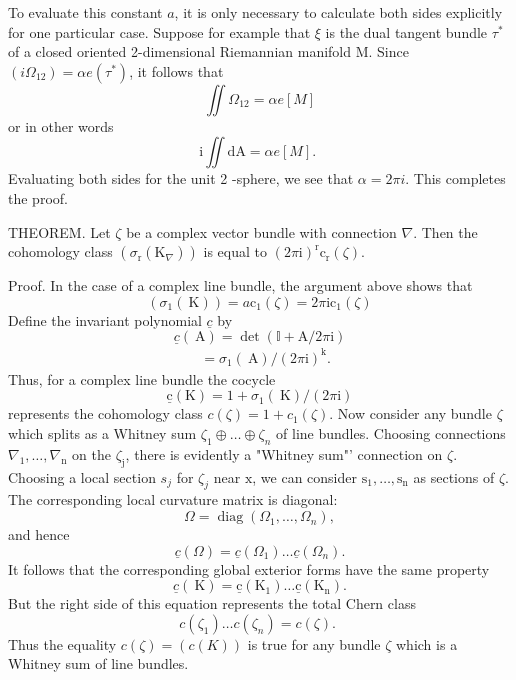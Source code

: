 \documentclass[10pt]{article}
\begin{document}
To evaluate this constant $a$, it is only necessary to calculate both sides explicitly for one particular case. Suppose for example that $\xi$ is the dual tangent bundle $\tau^{*}$ of a closed oriented 2-dimensional Riemannian manifold M. Since $\left(i \Omega_{12}\right)=\alpha e\left(\tau^{*}\right)$, it follows that
$$
\iint \Omega_{12}=\alpha e[M]
$$
or in other words
$$
\mathrm{i} \iint \mathrm{dA}=\alpha e[M] \text {. }
$$
Evaluating both sides for the unit 2 -sphere, we see that $\alpha=2 \pi i$. This completes the proof.

THEOREM. Let $\zeta$ be a complex vector bundle with connection $\nabla$. Then the cohomology class $\left(\sigma_{\mathrm{r}}\left(\mathrm{K}_{\nabla}\right)\right)$ is equal to $(2 \pi \mathrm{i})^{\mathrm{r}} \mathrm{c}_{\mathrm{r}}(\zeta)$.

Proof. In the case of a complex line bundle, the argument above shows that
$$
\left(\sigma_{1}(\mathrm{~K})\right)=a \mathrm{c}_{1}(\zeta)=2 \pi \mathrm{ic}_{1}(\zeta)
$$
Define the invariant polynomial $\underline{c}$ by
$$
\underline{c}(\mathrm{~A})=\operatorname{det}(\mathbb{I}+\mathrm{A} / 2 \pi \mathrm{i})
$$
$$
\begin{aligned}
& =\sigma_{1}(\mathrm{~A}) /(2 \pi \mathrm{i})^{\mathrm{k}} . 
\end{aligned}
$$
Thus, for a complex line bundle the cocycle
$$
\underline{\mathrm{c}}(\mathrm{K})=1+\sigma_{1}(\mathrm{~K}) /(2 \pi \mathrm{i})
$$
represents the cohomology class $c(\zeta)=1+c_{1}(\zeta)$. Now consider any bundle $\zeta$ which splits as a Whitney sum $\zeta_{1} \oplus \ldots \oplus \zeta_{n}$ of line bundles. Choosing connections $\nabla_{1}, \ldots, \nabla_{\mathrm{n}}$ on the $\zeta_{\mathrm{j}}$, there is evidently a "Whitney sum"' connection on $\zeta$. Choosing a local section $s_{j}$ for $\zeta_{j}$ near $\mathrm{x}$, we can consider $\mathrm{s}_{1}, \ldots, \mathrm{s}_{\mathrm{n}}$ as sections of $\zeta$. The corresponding local curvature matrix is diagonal:
$$
\Omega=\operatorname{diag}\left(\Omega_{1}, \ldots, \Omega_{n}\right),
$$
and hence
$$
\underline{c}(\Omega)=\underline{c}\left(\Omega_{1}\right) \ldots \underline{c}\left(\Omega_{n}\right) .
$$
It follows that the corresponding global exterior forms have the same property
$$
\underline{c}(\mathrm{~K})=\underline{\mathrm{c}}\left(\mathrm{K}_{1}\right) \ldots \underline{\mathrm{c}}\left(\mathrm{K}_{\mathrm{n}}\right) .
$$
But the right side of this equation represents the total Chern class
$$
c\left(\zeta_{1}\right) \ldots c\left(\zeta_{n}\right)=c(\zeta) \text {. }
$$
Thus the equality $c(\zeta)=(c(K))$ is true for any bundle $\zeta$ which is a Whitney sum of line bundles.
\end{document}
